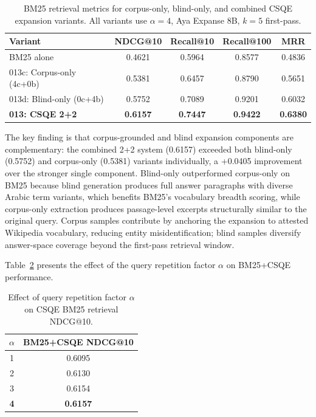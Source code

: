 \begin{table}[htbp]
    \centering
    \caption[CSQE corpus-only, blind-only and combined variants]{BM25 retrieval metrics for corpus-only, blind-only, and combined CSQE expansion variants. All variants use $\alpha=4$, Aya Expanse 8B, $k=5$ first-pass.}
    \label{tab:csqe_ablation}
    \begin{tabular}{@{}lcccc@{}}
        \toprule
        \textbf{Variant} & \textbf{NDCG@10} & \textbf{Recall@10} & \textbf{Recall@100} & \textbf{MRR} \\
        \midrule
        BM25 alone & 0.4621 & 0.5964 & 0.8577 & 0.4836 \\
        013c: Corpus-only (4c+0b) & 0.5381 & 0.6457 & 0.8790 & 0.5651 \\
        013d: Blind-only (0c+4b) & 0.5752 & 0.7089 & 0.9201 & 0.6032 \\
        \textbf{013: CSQE 2+2} & \textbf{0.6157} & \textbf{0.7447} & \textbf{0.9422} & \textbf{0.6380} \\
        \bottomrule
    \end{tabular}
\end{table}

The key finding is that corpus-grounded and blind expansion components are complementary: the combined 2+2 system (0.6157) exceeded both blind-only (0.5752) and corpus-only (0.5381) variants individually, a +0.0405 improvement over the stronger single component. Blind-only outperformed corpus-only on BM25 because blind generation produces full answer paragraphs with diverse Arabic term variants, which benefits BM25's vocabulary breadth scoring, while corpus-only extraction produces passage-level excerpts structurally similar to the original query. Corpus samples contribute by anchoring the expansion to attested Wikipedia vocabulary, reducing entity misidentification; blind samples diversify answer-space coverage beyond the first-pass retrieval window.

Table~\ref{tab:alpha_sweep} presents the effect of the query repetition factor $\alpha$ on BM25+CSQE performance.

\begin{table}[htbp]
    \centering
    \caption[Effect of repetition factor $\alpha$ on CSQE BM25]{Effect of query repetition factor $\alpha$ on CSQE BM25 retrieval NDCG@10.}
    \label{tab:alpha_sweep}
    \begin{tabular}{@{}cc@{}}
        \toprule
        $\alpha$ & \textbf{BM25+CSQE NDCG@10} \\
        \midrule
        1 & 0.6095 \\
        2 & 0.6130 \\
        3 & 0.6154 \\
        \textbf{4} & \textbf{0.6157} \\
        \bottomrule
    \end{tabular}
\end{table}


